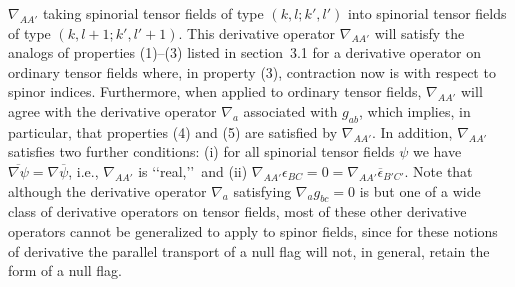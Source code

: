 \(\nabla_{AA'}\) taking spinorial tensor fields of type \((k,l;k',l')\) into
spinorial tensor fields of type \((k,l+1;k',l'+1)\). This derivative operator
\(\nabla_{AA'}\) will satisfy the analogs of properties (1)--(3) listed in
section~3.1 for a derivative operator on ordinary tensor fields where, in property
(3), contraction now is with respect to spinor indices. Furthermore, when applied
to ordinary tensor fields, \(\nabla_{AA'}\) will agree with the derivative operator
\(\nabla_a\) associated with \(g_{ab}\), which implies, in particular, that
properties (4) and (5) are satisfied by \(\nabla_{AA'}\). In addition,
\(\nabla_{AA'}\) satisfies two further conditions: (i) for all spinorial tensor
fields \(\psi\) we have \(\overline{\nabla\psi}=\nabla\overline\psi\), i.e.,
\(\nabla_{AA'}\) is \lq\lq real,\rq\rq\ and (ii)
\(\nabla_{AA'}\epsilon_{BC}=0=\nabla_{AA'}\overline\epsilon_{B'C'}\). Note that
although the derivative operator \(\nabla_a\) satisfying \(\nabla_a g_{bc}=0\) is
but one of a wide class of derivative operators on tensor fields, most of these
other derivative operators cannot be generalized to apply to spinor fields, since
for these notions of derivative the parallel transport of a null flag will not, in
general, retain the form of a null flag.

